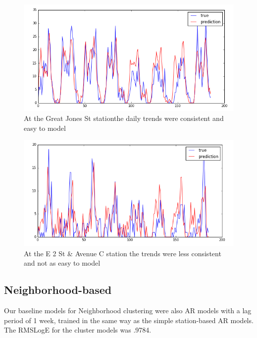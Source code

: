 \documentclass{proc}
\begin{document}
\begin{figure}[!hbt]
	\begin{center}
	\includegraphics[width=\columnwidth]{station_229ar.png}
	\caption{At the Great Jones St stationthe daily trends were consistent and easy to model}
	\end{center}
\end{figure}
\begin{figure}[!hbt]
	\begin{center}
	\includegraphics[width=\columnwidth]{station_150ar.png}
	\caption{At the E 2 St \& Avenue C station the trends were less consistent and not as easy to model}
	\end{center}
\end{figure}





\subsection{Neighborhood-based}
Our baseline models for Neighborhood clustering were also AR models with a lag period of 1 week, trained in the same way as the simple station-based AR models. The RMSLogE for the cluster models was .9784.
\end{document}
